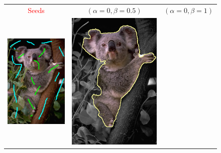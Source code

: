 \documentclass[smallextended]{svjour3}       %
\newcommand{\revision}[1]{\textcolor{red}{#1}}
\begin{document}
{{\begin{figure}[ht!]
\center
\begin{tabular}{ccc}
\revision{Seeds} & $(\alpha=0, \beta=0.5)$ & $(\alpha=0,\beta=1)$ \\
 	\includegraphics[scale=0.25]{segmentation_bc_coala_seeds.png} & 
	\includegraphics[scale=0.25]{segmentation_bc_coala_r3_lg0_sq05_dt1_it50.png} & 

\end{tabular}
\end{figure}}}
\end{document}
